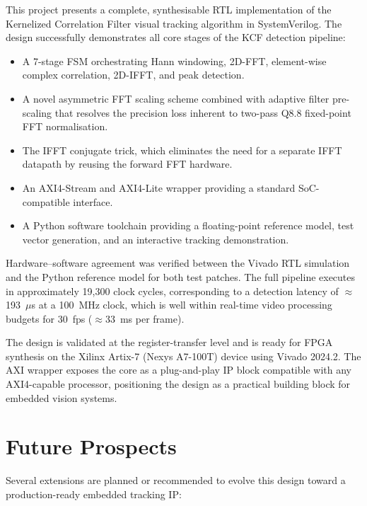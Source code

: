 \documentclass[a4paper,12pt]{report}
\begin{document}
This project presents a complete, synthesisable RTL implementation of the Kernelized Correlation Filter visual tracking algorithm in SystemVerilog. The design successfully demonstrates all core stages of the KCF detection pipeline:

\begin{itemize}
    \item A 7-stage FSM orchestrating Hann windowing, 2D-FFT, element-wise complex correlation, 2D-IFFT, and peak detection.
    \item A novel asymmetric FFT scaling scheme combined with adaptive filter pre-scaling that resolves the precision loss inherent to two-pass Q8.8 fixed-point FFT normalisation.
    \item The IFFT conjugate trick, which eliminates the need for a separate IFFT datapath by reusing the forward FFT hardware.
    \item An AXI4-Stream and AXI4-Lite wrapper providing a standard SoC-compatible interface.
    \item A Python software toolchain providing a floating-point reference model, test vector generation, and an interactive tracking demonstration.
\end{itemize}

\par Hardware--software agreement was verified between the Vivado RTL simulation and the Python reference model for both test patches. The full pipeline executes in approximately 19{,}300 clock cycles, corresponding to a detection latency of $\approx$193~$\mu$s at a 100~MHz clock, which is well within real-time video processing budgets for 30~fps ($\approx$33~ms per frame).

\par The design is validated at the register-transfer level and is ready for FPGA synthesis on the Xilinx Artix-7 (Nexys A7-100T) device using Vivado 2024.2. The AXI wrapper exposes the core as a plug-and-play IP block compatible with any AXI4-capable processor, positioning the design as a practical building block for embedded vision systems.

\chapter{Future Prospects}

Several extensions are planned or recommended to evolve this design toward a production-ready embedded tracking IP:
\end{document}
